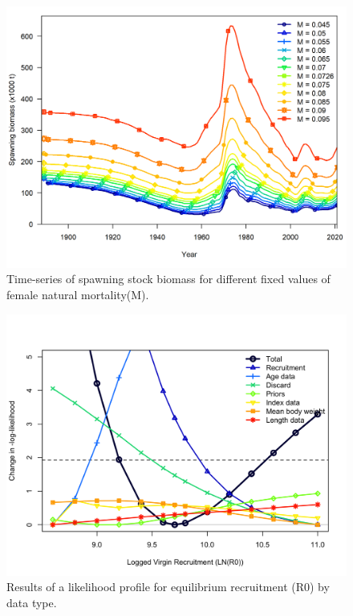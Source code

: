 \documentclass[11pt,
  english,
  a4paper,
]{article}
\begin{document}
\tagmcend\tagstructend


\begin{figure}
\centering
\includegraphics[width=1\textwidth,height=1\textheight]{figs/sens_m_ssb.png}
\caption{Time-series of spawning stock biomass for different fixed values of female natural mortality(M).\label{fig:sens_m_ssb}}
\end{figure}

\tagmcend\tagstructend


\begin{figure}
\centering
\includegraphics[width=1\textwidth,height=1\textheight]{figs/rprofile_plot_like.png}
\caption{Results of a likelihood profile for equilibrium recruitment (R0) by data type.\label{fig:sens_R0_like}}
\end{figure}
\end{document}
